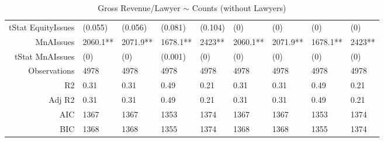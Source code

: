 \begin{table}[ht]
\begin{tabular}{rllllllll}
  tStat EquityIssues & (0.055) & (0.056) & (0.081) & (0.104) & (0) & (0) & (0) & (0) \\ 
  MnAIssues & 2060.1** & 2071.9** & 1678.1** & 2423** & 2060.1** & 2071.9** & 1678.1** & 2423** \\ 
  tStat MnAIssues & (0) & (0) & (0.001) & (0) & (0) & (0) & (0) & (0) \\ 
  Observations & 4978 & 4978 & 4978 & 4978 & 4978 & 4978 & 4978 & 4978 \\ 
  R2 & 0.31 & 0.31 & 0.49 & 0.21 & 0.31 & 0.31 & 0.49 & 0.21 \\ 
  Adj R2 & 0.31 & 0.31 & 0.49 & 0.21 & 0.31 & 0.31 & 0.49 & 0.21 \\ 
  AIC & 1367 & 1367 & 1353 & 1374 & 1367 & 1367 & 1353 & 1374 \\ 
  BIC & 1368 & 1368 & 1355 & 1374 & 1368 & 1368 & 1355 & 1374 \\ 
   \hline
\end{tabular}
\caption{Gross Revenue/Lawyer $\sim$ Counts (without Lawyers)} 
\end{table}
